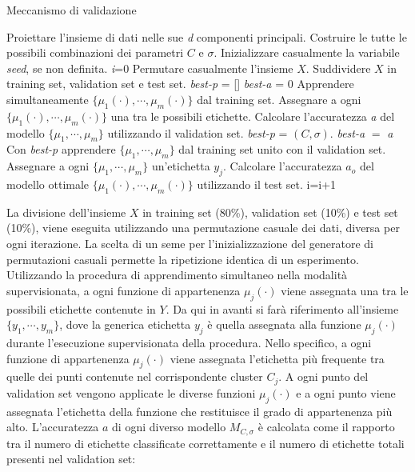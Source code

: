 \documentclass [11pt,a4paper,twoside,openright] {book}
\begin{document}
\begin{algorithm}
\caption{Meccanismo di validazione}\label{validazione}
\begin{algorithmic}[1]
\State Proiettare l'insieme di dati nelle sue \textit{d} componenti principali.
\State Costruire le tutte le possibili combinazioni dei parametri $C$ e $\sigma$.
\State Inizializzare casualmente la variabile \textit{seed}, se non definita. 
\State \textit{i}=0
\State Permutare casualmente l'insieme $X$.
\State Suddividere $X$ in training set, validation set e test set.
\State \textit{best-p} = []
\State \textit{best-a} = 0
\State Apprendere simultaneamente $\lbrace \mu_1(\cdot), \cdots, \mu_m(\cdot) \rbrace$ dal training set.
\State Assegnare a ogni $\lbrace \mu_1(\cdot), \cdots, \mu_m(\cdot) \rbrace$ una tra le possibili etichette.
\State Calcolare l'accuratezza \textit{a} del modello $\lbrace \mu_1, \cdots, \mu_m \rbrace$ utilizzando il validation set.
 \State \textit{best-p} = $(C, \sigma)$. \State \textit{best-a} $=$ \textit{a} \EndIf
\EndFor
\State Con \textit{best-p} apprendere $\lbrace \mu_1, \cdots, \mu_m \rbrace$ dal training set unito con il validation set.
\State Assegnare a ogni $\lbrace \mu_1, \cdots, \mu_m \rbrace$ un'etichetta $y_j$.
\State Calcolare l'accuratezza {$a_o$} del modello ottimale $\lbrace \mu_1(\cdot), \cdots, \mu_m(\cdot) \rbrace$ utilizzando il test set.
\State i=i+1
\EndWhile
\end{algorithmic}
\end{algorithm}
\noindent
La divisione dell'insieme $X$ in training set (80\%), validation set (10\%) e test set (10\%), viene eseguita utilizzando una permutazione casuale dei dati, diversa per ogni iterazione. La scelta di un seme per l'inizializzazione del generatore di permutazioni casuali permette la ripetizione identica di un esperimento.
Utilizzando la procedura di apprendimento simultaneo nella modalità supervisionata, a ogni funzione di appartenenza $\mu_j(\cdot)$ viene assegnata una tra le possibili etichette contenute in $Y$. Da qui in avanti si farà riferimento all'insieme $\lbrace y_1, \cdots, y_m \rbrace$, dove la generica etichetta $y_j$ è quella assegnata alla funzione $\mu_j(\cdot)$ durante l'esecuzione supervisionata della procedura. Nello specifico, a ogni funzione di appartenenza $\mu_j(\cdot)$ viene assegnata l'etichetta più frequente tra quelle dei punti contenute nel corrispondente cluster $C_j$.
A ogni punto del validation set vengono applicate le diverse funzioni $\mu_j(\cdot)$ e a ogni punto viene assegnata l'etichetta della funzione che restituisce il grado di appartenenza più alto. L'accuratezza $a$ di ogni diverso modello $M_{C,\sigma}$ è calcolata come il rapporto tra il numero di etichette classificate correttamente e il numero di etichette totali presenti nel validation set:
\end{document}
